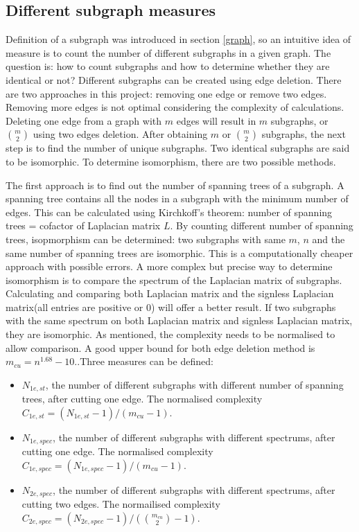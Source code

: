 \documentclass[12pt]{article}
\begin{document}
\subsection{Different subgraph measures}
Definition of a subgraph was introduced in section \ref{graph}, so an intuitive idea of measure is to count the number of different subgraphs in a given graph. The question is: how to count subgraphs and how to determine whether they are identical or not? Different subgraphs can be created using edge deletion. There are two approaches in this project: removing one edge or remove two edges. Removing more edges is not optimal considering the complexity of calculations. Deleting one edge from a graph with $m$ edges will result in $m$ subgraphs, or ${m \choose 2}$ using two edges deletion. After obtaining $m$ or ${m \choose 2}$ subgraphs, the next step is to find the number of unique subgraphs. Two identical subgraphs are said to be isomorphic. To determine isomorphism, there are two possible methods.\par
The first approach is to find out the number of spanning trees of a subgraph. A spanning tree contains all the nodes in a subgraph with the minimum number of edges. This can be calculated using Kirchkoff's theorem\cite{priezzhev1985dimer}: number of spanning trees = cofactor of Laplacian matrix $L$. By counting different number of spanning trees, isopmorphism can be determined: two subgraphs with same $m$, $n$ and the same number of spanning trees are isomorphic. This is a computationally cheaper approach with possible errors. A more complex but precise way to determine isomorphism is to compare the spectrum of the Laplacian matrix of subgraphs. Calculating and comparing both Laplacian matrix and the signless Laplacian matrix(all entries are positive or 0) will offer a better result. If two subgraphs with the same spectrum on both Laplacian matrix and signless Laplacian matrix, they are isomorphic. As mentioned, the complexity needs to be normalised to allow comparison. A good upper bound for both edge deletion method is $m_{cu}=n^{1.68}-10$.\cite{KIM20082637}.Three measures can be defined:
\begin{itemize}
    \item $N_{1e,st}$, the number of different subgraphs with different number of spanning trees, after cutting one edge. The normalised complexity $C_{1e,st} = (N_{1e,st}-1)/(m_{cu}-1)$.
    \item $N_{1e,spec}$, the number of different subgraphs with different spectrums, after cutting one edge. The normalised complexity $C_{1e,spec} = (N_{1e,spec}-1)/(m_{cu}-1)$.
    \item $N_{2e,spec}$, the number of different subgraphs with different spectrums, after cutting two edges. The normailised complexity $C_{2e,spec} = (N_{2e,spec}-1)/({m_{cu} \choose 2}-1)$.
\end{itemize}
\end{document}
